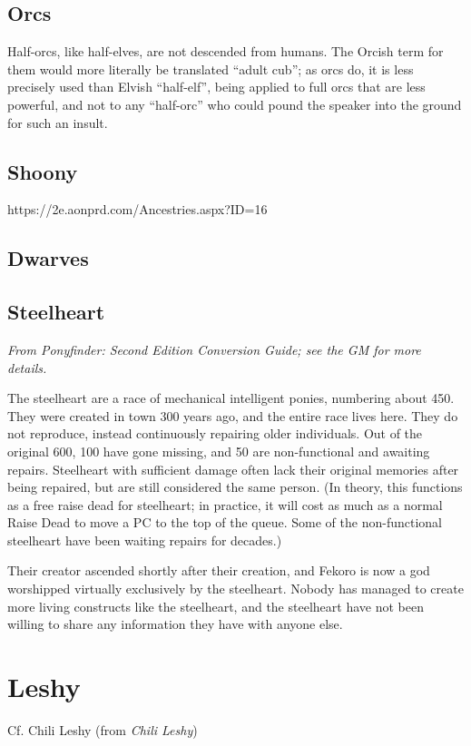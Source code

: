 \documentclass{report}
\begin{document}
\subsection{Orcs}

Half-orcs, like half-elves, are not descended from humans. The Orcish term for
them would more literally be translated ``adult cub''; as orcs do, it is less
precisely used than Elvish ``half-elf'', being applied to full orcs that are less powerful, and not to
any ``half-orc'' who could pound the speaker into the ground for such an insult.

\subsection{Shoony}

https://2e.aonprd.com/Ancestries.aspx?ID=16

\subsection{Dwarves}



\subsection{Steelheart}

\emph{From \emph{Pony\-finder: Second Edition Conversion Guide}; see the GM
for more details.}

The steelheart are a race of mechanical intelligent ponies, numbering about 450.
They were created in town 300 years ago, and the entire race lives here. They
do not reproduce, instead continuously repairing older individuals. Out of the
original 600, 100 have gone missing, and 50 are non-functional and awaiting
repairs. Steelheart with sufficient damage often lack their original memories
after being repaired, but are still considered the same person. (In theory,
this functions as a free raise dead for steelheart; in practice, it will
cost as much as a normal Raise Dead to move a PC to the top of the queue. Some
of the non-functional steelheart have been waiting repairs for decades.)

Their creator ascended shortly after their creation, and Fekoro is now a god
worshipped virtually exclusively by the steelheart. Nobody has managed to create
more living constructs like the steelheart, and the steelheart have not been
willing to share any information they have with anyone else.

\section{Leshy}

Cf. Chili Leshy (from \emph{Chili Leshy})
\end{document}
